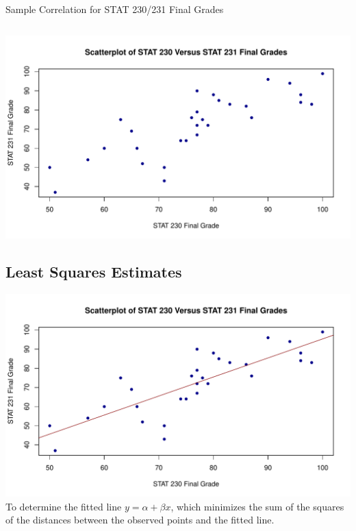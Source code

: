 \documentclass[oneside]{book}\usepackage[]{graphicx}\usepackage[]{color}
\makeatletter
\def\maxwidth{ %
  \ifdim\Gin@nat@width>\linewidth
    \linewidth
  \else
    \Gin@nat@width
  \fi
}
\newenvironment{kframe}{%
 \def\at@end@of@kframe{}%
 \ifinner\ifhmode%
  \def\at@end@of@kframe{\end{minipage}}%
  \begin{minipage}{\columnwidth}%
 \fi\fi%
 \def\FrameCommand##1{\hskip\@totalleftmargin \hskip-\fboxsep
 \colorbox{shadecolor}{##1}\hskip-\fboxsep
     \hskip-\linewidth \hskip-\@totalleftmargin \hskip\columnwidth}%
 \MakeFramed {\advance\hsize-\width
   \@totalleftmargin\z@ \linewidth\hsize
   \@setminipage}}%
 {\par\unskip\endMakeFramed%
 \at@end@of@kframe}
\newenvironment{knitrout}{}{} %
\makeatother
\begin{document}
\begin{Example}{Sample Correlation for STAT 230/231 Final Grades}
\begin{knitrout}
\begin{kframe}
\begin{verbatim}
\end{verbatim}
\end{kframe}
\end{knitrout}
\begin{knitrout}
\color{fgcolor}
\includegraphics[width=\maxwidth]{figure/unnamed-chunk-3-1} 
\end{knitrout}
\end{Example}
\subsection{Least Squares Estimates}
\begin{knitrout}
\color{fgcolor}
\includegraphics[width=\maxwidth]{figure/unnamed-chunk-4-1} 
\end{knitrout}
To determine the fitted line $ y=\alpha+\beta x $, which minimizes the sum of the squares
of the distances between the observed points and the fitted line.
\end{document}

